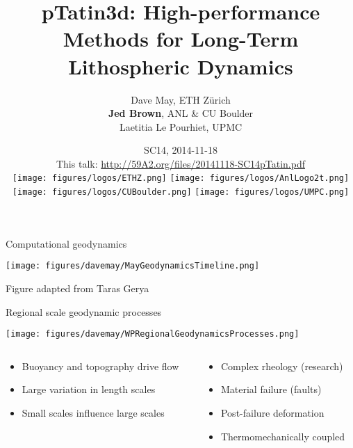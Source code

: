 \documentclass{beamer}
\title{\textbf{pTatin3d}: High-performance Methods for Long-Term Lithospheric Dynamics}
\author{Dave May, ETH Z\"urich\\
{\bf Jed Brown}, ANL \& CU Boulder\\
Laetitia Le Pourhiet, UPMC}
\date{SC14, 2014-11-18 \\[1em]
This talk: \url{http://59A2.org/files/20141118-SC14pTatin.pdf} \\
\texttt{[image: figures/logos/ETHZ.png]} \quad
\texttt{[image: figures/logos/AnlLogo2t.png]} \quad
\texttt{[image: figures/logos/CUBoulder.png]} \quad
\texttt{[image: figures/logos/UMPC.png]}
}
\begin{document}
\lstset{language=C}
\normalem

\begin{frame}
  \titlepage
\end{frame}

\begin{frame}{Computational geodynamics}
  \begin{center}
    \texttt{[image: figures/davemay/MayGeodynamicsTimeline.png]}
  \end{center}
  \vspace{-1ex}
  {\scriptsize Figure adapted from Taras Gerya}
\end{frame}

\begin{frame}{Regional scale geodynamic processes}
  \begin{center}
    \texttt{[image: figures/davemay/WPRegionalGeodynamicsProcesses.png]}
  \end{center}
  \begin{columns}
    \begin{column}{0.5\textwidth}
      \begin{itemize}
      \item Buoyancy and topography drive flow
      \item Large variation in length scales
      \item Small scales influence large scales
      \end{itemize}
    \end{column}
    \begin{column}{0.5\textwidth}
      \begin{itemize}
      \item Complex rheology (research)
      \item Material failure (faults)
      \item Post-failure deformation
      \item Thermomechanically coupled
      \end{itemize}
    \end{column}
  \end{columns}
\end{frame}
\end{document}

